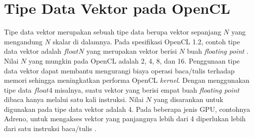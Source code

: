 \section{Tipe Data Vektor pada OpenCL}
Tipe data vektor merupakan sebuah tipe data berupa vektor sepanjang $N$ yang mengandung $N$ skalar di dalamnya. Pada spesifikasi OpenCL 1.2, contoh tipe data vektor adalah $floatN$ yang merupakan vektor berisi $N$ buah \textit{floating point} \cite{opencl}. Nilai $N$ yang mungkin pada OpenCL adalah 2, 4, 8, dan 16. Penggunaan tipe data vektor dapat membantu mengurangi biaya operasi baca/tulis terhadap memori sehingga meningkatkan performa OpenCL \textit{kernel}. Dengan menggunakan tipe data $float4$ misalnya, suatu vektor yang berisi empat buah \textit{floating point} dibaca hanya melalui satu kali instruksi. Nilai $N$ yang disarankan untuk digunakan pada tipe data vektor adalah 4. Pada beberapa jenis GPU, contohnya Adreno, untuk mengakses vektor yang panjangnya lebih dari 4 diperlukan lebih dari satu instruksi baca/tulis \cite{adrenoopencl}.